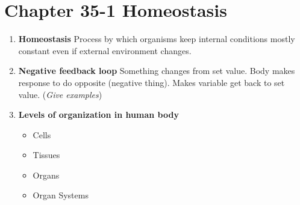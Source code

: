 \documentclass[9pt]{article}
\begin{document}
\section*{Chapter 35-1 Homeostasis}
\begin{enumerate}
  \item {\bf Homeostasis} Process by which organisms keep internal
    conditions mostly constant even if external environment changes.
  \item {\bf Negative feedback loop} Something changes from set
    value. Body makes response to do opposite (negative thing). Makes
    variable get back to set value. ({\em Give examples})
  \item {\bf Levels of organization in human body}
    \begin{itemize}
    \item Cells
    \item Tissues
    \item Organs
    \item Organ Systems      
    \end{itemize}
\end{enumerate}
\end{document}
